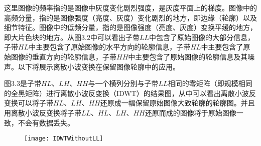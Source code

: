 %

这里图像的频率指的是图像中灰度变化剧烈强度，是灰度平面上的梯度。图像中的高频分量，指的是图像强度（亮度、灰度）变化剧烈的地方，即边缘（轮廓）以及细节特征。图像中的低频分量，指的是图像强度（亮度、灰度）变换平缓的地方，即大片色块的地方。从图$3.2$中可以看出子带$LL$中包含了原始图像的大部分信息，子带$HL$中主要包含了原始图像的水平方向的轮廓信息，子带$HL$中主要包含了原始图像的垂直方向的轮廓信息，子带$HH$中主要包含了原始图像的轮廓信息及其噪声。以下将展示离散小波变换在保留图像轮廓中的应用。

图$3.3$是子带$HL$、$LH$、$HH$与一个横列分别与子带$LL$相同的零矩阵（即规模相同的全黑矩阵）进行离散小波反变换（IDWT）的结果图，从中可以看出离散小波反变换可以将子带$HL$、$LH$、$HH$还原成一幅保留原始图像大致轮廓的轮廓图。并且用离散小波反变换将子带$LL$、$HL$、$LH$、$HH$还原而成的图像将于原始图像一致，不会有数据丢失。

\begin{figure}[htb!]
    \centering
    \texttt{[image: IDWTWithoutLL]}
    \label{fig:tc_q_criteria}
\end{figure}



